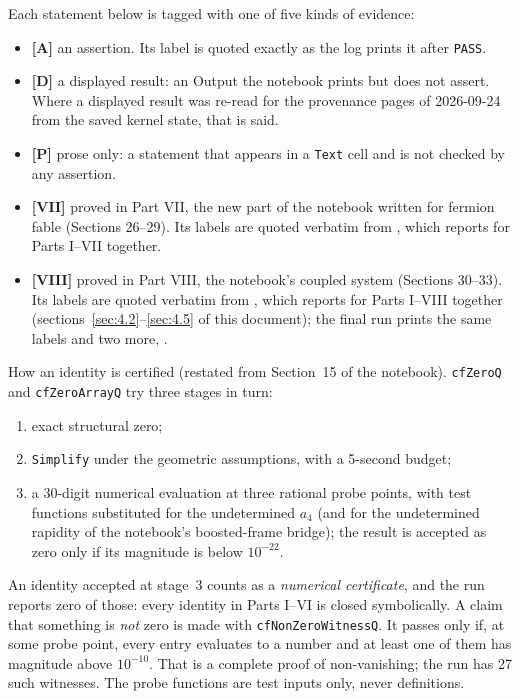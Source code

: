 Each statement below is tagged with one of five kinds of evidence:
\begin{itemize}
  \item \textbf{[A]} an assertion. Its label is quoted exactly as the log prints it after
        \texttt{PASS}.
  \item \textbf{[D]} a displayed result: an Output the notebook prints but does not assert.
        Where a displayed result was re-read for the provenance pages of 2026-09-24 from the saved kernel state,
        that is said.
  \item \textbf{[P]} prose only: a statement that appears in a \texttt{Text} cell and is not
        checked by any assertion.
  \item \textbf{[VII]} proved in Part VII, the new part of the notebook written for fermion
        fable (Sections 26--29). Its labels are quoted verbatim from
        , which reports
         for Parts I--VII together.
  \item \textbf{[VIII]} proved in Part VIII, the notebook's coupled system (Sections 30--33). Its labels are
        quoted verbatim from , which reports
         for Parts I--VIII together
        (sections~\ref{sec:4.2}--\ref{sec:4.5} of this document); the final run
         prints the same labels and two more,
        .
\end{itemize}

How an identity is certified (restated from Section~15 of the notebook). \texttt{cfZeroQ} and
\texttt{cfZeroArrayQ} try three stages in turn:
\begin{enumerate}
  \item exact structural zero;
  \item \texttt{Simplify} under the geometric assumptions, with a 5-second budget;
  \item a 30-digit numerical evaluation at three rational probe points, with test functions
        substituted for the undetermined $a_4$ (and for the undetermined rapidity of the
        notebook's boosted-frame bridge); the result is accepted as zero only if its magnitude
        is below $10^{-22}$.
\end{enumerate}
An identity accepted at stage~3 counts as a \emph{numerical certificate}, and the run reports
zero of those: every identity in Parts I--VI is closed symbolically. A claim that something is
\emph{not} zero is made with \texttt{cfNonZeroWitnessQ}. It passes only if, at some probe point,
every entry evaluates to a number and at least one of them has magnitude above $10^{-10}$. That
is a complete proof of non-vanishing; the run has 27 such witnesses. The probe functions are
test inputs only, never definitions.

